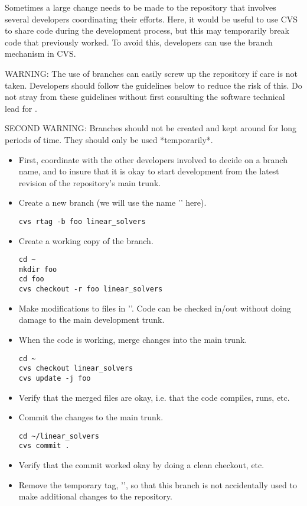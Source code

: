Sometimes a large change needs to be made to the repository that
involves several developers coordinating their efforts.  Here, it
would be useful to use CVS to share code during the development
process, but this may temporarily break code that previously worked.
To avoid this, developers can use the branch mechanism in CVS.

WARNING: The use of branches can easily screw up the repository if
care is not taken.  Developers should follow the guidelines below to
reduce the risk of this.  Do not stray from these guidelines without
first consulting the software technical lead for \hypre{}.

SECOND WARNING: Branches should not be created and kept around for
long periods of time.  They should only be used *temporarily*.

\begin{itemize}

\item First, coordinate with the other developers involved to decide
on a branch name, and to insure that it is okay to start development
from the latest revision of the repository's main trunk.

\item Create a new branch (we will use the name '' here).
\begin{verbatim}
cvs rtag -b foo linear_solvers
\end{verbatim}

\item Create a working copy of the branch.
\begin{verbatim}
cd ~
mkdir foo
cd foo
cvs checkout -r foo linear_solvers
\end{verbatim}

\item Make modifications to files in ''.
Code can be checked in/out without doing damage to the main
development trunk.

\item When the code is working, merge changes into the main trunk.
\begin{verbatim}
cd ~
cvs checkout linear_solvers
cvs update -j foo
\end{verbatim}

\item Verify that the merged files are okay, i.e. that the code compiles,
runs, etc.

\item Commit the changes to the main trunk.
\begin{verbatim}
cd ~/linear_solvers
cvs commit .
\end{verbatim}

\item Verify that the commit worked okay by doing a clean checkout, etc.

\item Remove the temporary tag, '', so that this branch is
not accidentally used to make additional changes to the repository.

\end{itemize}

